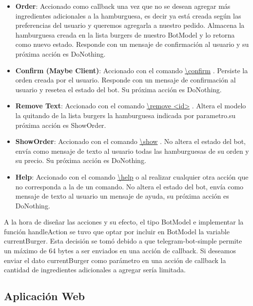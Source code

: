\documentclass[a4paper,12pt]{article}
\begin{document}
\begin{itemize}
	\item
	\textbf{Order}: Accionado como callback una vez que no se desean agregar más ingredientes adicionales a la hamburguesa, es decir ya está creada según las preferencias del usuario y queremos agregarla a nuestro pedido. Almacena la hamburguesa creada en la lista burgers de nuestro BotModel y lo retorna como nuevo estado. Responde con un mensaje de confirmación al usuario y su próxima acción es DoNothing.
	
	\item
	\textbf{Confirm \color{blue}(Maybe Client)\color{black}}: Accionado con el comando 
	\color{blue}\uline{\textbackslash confirm}\color{black}
	. Persiste la orden creada por el usuario. Responde con un mensaje de confirmación al usuario y resetea el estado del bot. Su próxima acción es DoNothing.
	
	\item
	\textbf{Remove \color{blue}Text\color{black}}: Accionado con el comando 
	\color{blue}\uline{\textbackslash remove <id>}\color{black}
	. Altera el modelo la quitando de la lista burgers la hamburguesa indicada por parametro.su próxima acción es ShowOrder. 
	
	\item
	\textbf{ShowOrder}: Accionado con el comando 
	\color{blue}\uline{\textbackslash show}\color{black}
	. No altera el estado del bot, envía como mensaje de texto al usuario todas las hamburguesas de su orden y su precio. Su próxima acción es DoNothing.
	
	\item
	\textbf{Help}: Accionado con el comando 
	\color{blue}\uline{\textbackslash help}\color{black}
	 o al realizar cualquier otra acción que no corresponda a la de un comando. No altera el estado del bot, envía como mensaje de texto al usuario un mensaje de ayuda, su próxima acción es DoNothing. 
	
\end{itemize}

A la hora de diseñar las acciones y su efecto, el tipo BotModel e implementar la función handleAction se tuvo que optar por incluir en BotModel la variable currentBurger. Esta decisión se tomó debido a que telegram-bot-simple permite un máximo de 64 bytes a ser enviados en una acción de callback. Si deseamos enviar el dato currentBurger como parámetro en una acción de callback la cantidad de ingredientes adicionales a agregar sería limitada.

\subsection{Aplicación Web}
\end{document}
